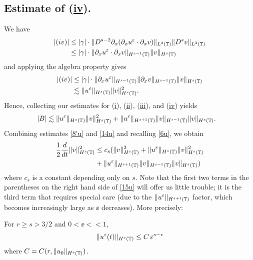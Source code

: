 	\subsection{ Estimate of (\hyperref[8u]{iv}).} We have
	\begin{equation*}
		\begin{split}
			|(iv)|
			& \le |\gamma| \cdot \|D^{s-2} \partial_x (\partial_x u^\varepsilon \cdot \partial_x v)
			\|_{L^2(\mathbb{T})} \|D^s v\|_{L^2(\mathbb{T})}
			\\
			& \le |\gamma| \cdot \|\partial_x u^\varepsilon \cdot \partial_x v \|_{H^{s-1}(\mathbb{T})}
			\|v\|_{H^s(\mathbb{T})}
		\end{split}
	\end{equation*}
	and applying the algebra property gives
	\begin{equation*}
		\begin{split}
			|(iv)|
			& \le |\gamma| \cdot \|\partial_x u^\varepsilon \|_{H^{s-1}(\mathbb{T})} \|\partial_x v
			\|_{H^{s-1}(\mathbb{T})} \|v\|_{H^s(\mathbb{T})}
			\\
			& \lesssim \|u^\varepsilon\|_{H^s(\mathbb{T})} \|v\|_{H^s(\mathbb{T})}^2.
		\end{split}
	\end{equation*}
	Hence, collecting our estimates for (\hyperref[8u]{i}),
	(\hyperref[8u]{ii}), (\hyperref[8u]{iii}), and (\hyperref[8u]{iv})
	yields
		\begin{equation}
		\begin{split}
			|B| 
			& \lesssim
			\|u^\varepsilon\|_{H^s(\mathbb{T})}
			\|v\|_{H^s(\mathbb{T})}^2 + \|u^\varepsilon\|_{H^{s+1}(\mathbb{T})}
			\|v\|_{H^{s-1}(\mathbb{T})} \|v\|_{H^s(\mathbb{T})}.
			\label{14u}
		\end{split}
	\end{equation}
	Combining estimates \eqref{8'u} and \eqref{14u} and recalling
	\eqref{6u}, we obtain
	\begin{equation}
		\begin{split}
			\frac{1}{2}\frac{d}{dt}\|v\|_{H^{s}(\mathbb{T})}^2
			& \le c_s(\|v\|_{H^s(\mathbb{T})}^3 + \|u^\varepsilon\|_{H^s(\mathbb{T})}
			\|v\|_{H^s(\mathbb{T})}^2
			\\
			& + \|u^\varepsilon\|_{H^{s+1}(\mathbb{T})}
			\|v\|_{H^{s-1}(\mathbb{T})} \|v\|_{H^s(\mathbb{T})})
			\label{15u}
		\end{split}
	\end{equation}
	where $c_s$ is a constant depending only on $s$.
	Note that the first two terms in the parentheses on the right hand side
	of \eqref{15u} will offer us little trouble;
	it is the third term that requires special care (due to the
	$\|u^\varepsilon\|_{H^{s+1}(\mathbb{T})}$ factor, which becomes increasingly large as
	$\ee$ decreases). More precisely:
	\begin{remark}
	\label{lem5r}
	For $r \ge s > 3/2$ and $0 < \ee <<1$, 
	\begin{equation}
		\begin{split}
			\|u^{\varepsilon} (t) \|_{H^r(\mathbb{T})} \le C \, \varepsilon^{s-r}
			\label{700r}
		\end{split}
	\end{equation}
	where $C = C(r, \|u_0\|_{H^s(\mathbb{T})})$.
\end{remark}	

